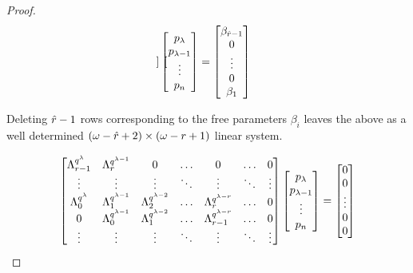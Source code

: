 \begin{proof}
\begin{equation}
\begin{bmatrix}
    
    \end{bmatrix}
    \begin{bmatrix}
    p_{\lambda} \\ p_{\lambda - 1} \\ \vdots \\ p_{n}
    \end{bmatrix}
    = 
    \begin{bmatrix}
    \beta_{\hat{r}-1} \\ 0 \\ \vdots \\ 0 \\ \beta_{1}
    \end{bmatrix}
\end{equation}

Deleting $\hat{r} - 1$ rows corresponding to the free parameters $\beta_i$ leaves the above as a well determined $ (\omega - \hat{r} + 2) \times (\omega - r + 1)$ linear system. 

\begin{equation}
    \label{reduced}
    \begin{bmatrix}
    \Lambda_{r - 1}^{q^{\lambda}} & \Lambda_{r}^{q^{\lambda - 1}} & 0 & \ldots & 0 & \ldots & 0 \\
    \vdots & \vdots & \vdots & \ddots & \vdots & \ddots & \vdots \\
    \Lambda_{0}^{q^{\lambda}} & \Lambda_{1}^{q^{\lambda - 1}} & \Lambda_{2}^{q^{\lambda - 2}} & \ldots & \Lambda_{r}^{q^{\lambda - r}} & \ldots & 0 \\
    0 & \Lambda_{0}^{q^{\lambda - 1}} & \Lambda_{1}^{q^{\lambda - 2}} & \ldots & \Lambda_{r-1}^{q^{\lambda - r}} & \ldots & 0 \\
    \vdots & \vdots & \vdots & \ddots & \vdots & \ddots & \vdots \\
    
    
    \end{bmatrix}
    \begin{bmatrix}
    p_{\lambda} \\ p_{\lambda - 1} \\ \vdots \\ p_{n}
    \end{bmatrix}
    = 
    \begin{bmatrix}
    0 \\ 0 \\ \vdots \\ 0 \\ 0
    \end{bmatrix}
\end{equation}


\end{proof}
